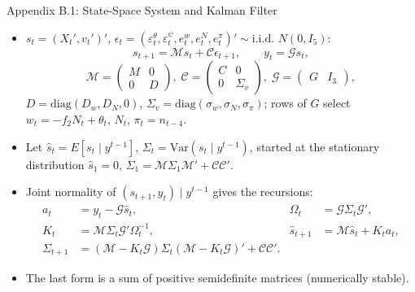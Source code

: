 \documentclass[10pt]{beamer}
\begin{document}
\begin{frame}{Appendix B.1: State-Space System and Kalman Filter}
  \small
  \begin{itemize}
    \item $s_t=(X_t',v_t')'$, $\epsilon_t=(\varepsilon^\theta_t,\varepsilon^\psi_t,e^w_t,e^N_t,e^\pi_t)'\sim\text{i.i.d. }N(0,I_5)$:
      \[ s_{t+1}=\mathcal Ms_t+\mathcal C\epsilon_{t+1},\qquad y_t=\mathcal Gs_t, \]
      \[ \mathcal M=\begin{pmatrix}M&0\\0&D\end{pmatrix},\;
         \mathcal C=\begin{pmatrix}C&0\\0&\Sigma_v\end{pmatrix},\;
         \mathcal G=\begin{pmatrix}G&I_3\end{pmatrix}, \]
      $D=\mathrm{diag}(D_w,D_N,0)$, $\Sigma_v=\mathrm{diag}(\sigma_w,\sigma_N,\sigma_\pi)$; rows of $G$ select $w_t=-f_2N_t+\theta_t$, $N_t$, $\pi_t=n_{t-4}$.
    \item Let $\hat s_t=E[s_t\mid y^{t-1}]$, $\Sigma_t=\mathrm{Var}(s_t\mid y^{t-1})$, started at the stationary distribution $\hat s_1=0$, $\Sigma_1=\mathcal M\Sigma_1\mathcal M'+\mathcal C\mathcal C'$.
    \item Joint normality of $(s_{t+1},y_t)\mid y^{t-1}$ gives the recursions:
      \begin{align*}
        a_t&=y_t-\mathcal G\hat s_t, & \Omega_t&=\mathcal G\Sigma_t\mathcal G',\\
        K_t&=\mathcal M\Sigma_t\mathcal G'\Omega_t^{-1}, & \hat s_{t+1}&=\mathcal M\hat s_t+K_ta_t,\\
        \Sigma_{t+1}&=(\mathcal M-K_t\mathcal G)\Sigma_t(\mathcal M-K_t\mathcal G)'+\mathcal C\mathcal C'. &&
      \end{align*}
    \item The last form is a sum of positive semidefinite matrices (numerically stable).
  \end{itemize}
\end{frame}
\end{document}
